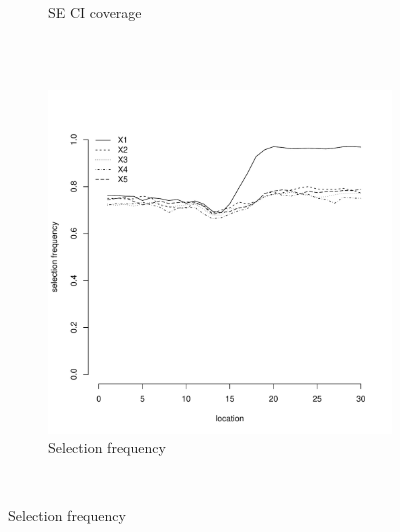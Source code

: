 \documentclass[authoryear, review, 11pt]{elsarticle}
\begin{document}
\begin{figure}
\begin{subfigure}[b]{0.45\textwidth}
		\caption{SE CI coverage}
	\end{subfigure}%
	\\%
	~ %
	\begin{subfigure}[b]{0.45\textwidth}
	\centering
		\includegraphics[width=\textwidth]{../../figures/simulation/15.29.profile_selection.pdf}
		\caption{Selection frequency}
	\end{subfigure}
	~ %

\end{figure}
\end{document}
